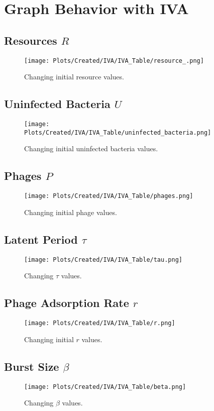 \section{Graph Behavior with IVA}
\label{sec:apendixF:graph_behavior_with_IVA}
\subsection{Resources $R$}
\begin{figure}[H]
    \texttt{[image: Plots/Created/IVA/IVA\_Table/resource\_.png]}
    \centering
    \caption{
        Changing initial resource values. 
    }
    \label{fig:created:IVA_IVAtable_resource}
\end{figure}

\subsection{Uninfected Bacteria $U$}
\begin{figure}[H]
    \texttt{[image: Plots/Created/IVA/IVA\_Table/uninfected\_bacteria.png]}
    \centering
    \caption{
        Changing initial uninfected bacteria values. 
    }
    \label{fig:created:IVA_IVAtable_uninfected_bacteria}
\end{figure}

\subsection{Phages $P$}
\begin{figure}[H]
    \texttt{[image: Plots/Created/IVA/IVA\_Table/phages.png]}
    \centering
    \caption{
        Changing initial phage values. 
    }
    \label{fig:created:IVA_IVAtable_phages}
\end{figure}

\subsection{Latent Period $\tau$}
\begin{figure}[H]
    \texttt{[image: Plots/Created/IVA/IVA\_Table/tau.png]}
    \centering
    \caption{
        Changing $\tau$ values. 
    }
    \label{fig:created:IVA_IVAtable_tau}
\end{figure}

\subsection{Phage Adsorption Rate $r$}
\begin{figure}[H]
    \texttt{[image: Plots/Created/IVA/IVA\_Table/r.png]}
    \centering
    \caption{
        Changing initial $r$ values. 
    }
    \label{fig:created:IVA_IVAtable_r}
\end{figure}

\subsection{Burst Size $\beta$}
\begin{figure}[H]
    \texttt{[image: Plots/Created/IVA/IVA\_Table/beta.png]}
    \centering
    \caption{
        Changing $\beta$ values. 
    }
    \label{fig:created:IVA_IVAtable_beta}
\end{figure}
